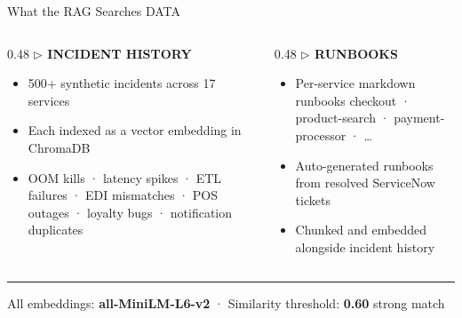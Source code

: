 \documentclass[aspectratio=169,10pt]{beamer}
\newcommand{\slidecat}[1]{{\color{cdim}\ttfamily\scriptsize\MakeUppercase{#1}}}
\begin{document}
\begin{frame}{What the RAG Searches}
  \slidecat{Data}
  \vspace{0.2cm}
  \begin{columns}[T]
    \begin{column}{0.48\textwidth}
      {\color{cteal}\ttfamily\small\bfseries $\triangleright$ INCIDENT HISTORY}
      \vspace{0.1cm}
      \begin{itemize}\itemsep2pt
        \item 500+ synthetic incidents across 17 services
        \item Each indexed as a vector embedding in ChromaDB
        \item {\color{cdim}\ttfamily\tiny OOM kills · latency spikes · ETL failures · EDI mismatches · POS outages · loyalty bugs · notification duplicates}
      \end{itemize}
    \end{column}
    \begin{column}{0.48\textwidth}
      {\color{cteal}\ttfamily\small\bfseries $\triangleright$ RUNBOOKS}
      \vspace{0.1cm}
      \begin{itemize}\itemsep2pt
        \item Per-service markdown runbooks
        {\color{cdim}\ttfamily\tiny checkout · product-search · payment-processor · \ldots}
        \item Auto-generated runbooks from resolved ServiceNow tickets
        \item Chunked and embedded alongside incident history
      \end{itemize}
    \end{column}
  \end{columns}
  \vspace{0.3cm}
  \rule{\textwidth}{0.3pt}
  {\color{cdim}\ttfamily\tiny
    All embeddings: {\color{cteal}\bfseries all-MiniLM-L6-v2} · Similarity threshold: {\color{cgreen}\bfseries 0.60} strong match}
\end{frame}
\end{document}
